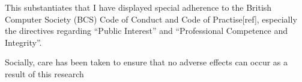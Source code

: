This substantiates that I have displayed special adherence to the British Computer Society (BCS) Code of Conduct and Code of Practise[ref], especially the directives regarding “Public Interest” and “Professional Competence and Integrity”.

Socially, care has been taken to ensure that no adverse effects can occur as a result of this research















